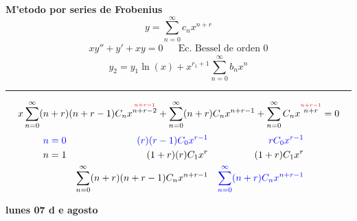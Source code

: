 \documentclass{article}
\theoremstyle{definition}
\begin{document}
\textbf{M'etodo por series de Frobenius}
\[y=\sum\limits^{\infty}_{n=0}c_nx^{n+r}\]
\begin{align*}
	xy''+y'+xy=0 && \text{Ec. Bessel de orden 0}
\end{align*}
\[y_2=y_1\ln (x) +x^{r_1+1}\sum\limits^{\infty}_{n=0} b_nx^n\]
\par\noindent\rule{\textwidth}{0.5pt}
\[x\sum\limits^{\infty}_{n=0} (n+r)(n+r-1)C_nx^{\overset{\textcolor{red}{n+r-1}}{n+r-2}}+\sum\limits^{\infty}_{n=0}(n+r)C_nx^{n+r-1}+\sum\limits^{\infty}_{n=0}C_nx^{\overset{\textcolor{red}{n+r-1}}{n+r}}=0\]
\begin{align*}
	\textcolor{blue}{n=0} && \textcolor{blue}{(r)(r-1)C_0x^{r-1}} && \textcolor{blue}{rC_0x^{r-1}}&&\\
	n=1 && (1+r)(r)C_1x^r && (1+r)C_1x^r\\
	&& \sum\limits^{\infty}_{n=0} (n+r)(n+r-1)C_nx^{n+r-1} && \textcolor{blue}{\sum\limits^{\infty}_{n=0} (n+r) C_nx^{n+r-1}}
\end{align*}

\newpage
\textbf{lunes 07 d e agosto}
\end{document}
